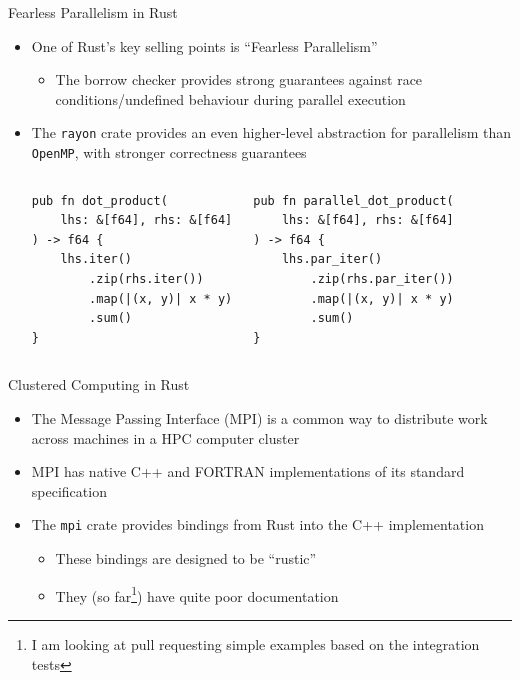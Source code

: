 \documentclass[10pt,aspectratio=169]{beamer}
\begin{document}
\begin{frame}[fragile]{Fearless Parallelism in Rust}
    \begin{itemize}
        \item<1-> One of Rust's key selling points is ``Fearless Parallelism''
        \begin{itemize}
            \item The borrow checker provides strong guarantees against race conditions/undefined behaviour during parallel execution
        \end{itemize}
        \vspace*{0.5cm}
        \item<2-> The \texttt{rayon} crate provides an even higher-level abstraction for parallelism than \texttt{OpenMP}, with stronger correctness guarantees
        \begin{columns}[T,onlytextwidth]
            \centering
            \begin{verbatim}
pub fn dot_product(
    lhs: &[f64], rhs: &[f64]
) -> f64 {
    lhs.iter()
        .zip(rhs.iter())
        .map(|(x, y)| x * y)
        .sum()
}
            \end{verbatim}
            \begin{verbatim}
pub fn parallel_dot_product(
    lhs: &[f64], rhs: &[f64]
) -> f64 {
    lhs.par_iter()
        .zip(rhs.par_iter())
        .map(|(x, y)| x * y)
        .sum()
}
            \end{verbatim}
        \end{columns}
    \end{itemize}
\end{frame}

\begin{frame}{Clustered Computing in Rust}
    \begin{itemize}
        \item The Message Passing Interface (MPI) is a common way to distribute work across machines in a HPC computer cluster
        \item MPI has native C++ and FORTRAN implementations of its standard specification
        \item The \texttt{mpi} crate provides bindings from Rust into the C++ implementation
        \begin{itemize}
            \item These bindings are designed to be ``rustic''
            \item They (so far\footnote{I am looking at pull requesting simple examples based on the integration tests}) have quite poor documentation
        \end{itemize}
    \end{itemize}
\end{frame}
\end{document}
